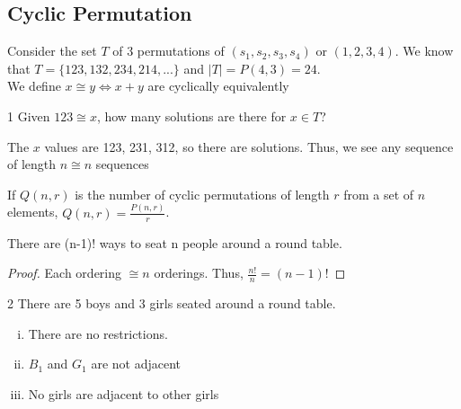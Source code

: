 \subsection{Cyclic Permutation}

Consider the set $T$ of 3 permutations of $(s_1, s_2, s_3, s_4)$ or $(1, 2, 3, 4)$. We know that $T = \{ 123, 132, 234, 214, ... \}$ and $|T| = P(4, 3) = 24$.\\

We define $x \cong y \iff x + y $ are cyclically equivalently 

\begin{problem}
    1 Given $123 \cong x$, how many solutions are there for $x \in T$?
\end{problem}

\begin{solution}
    The $x$ values are 123, 231, 312, so there are  solutions. Thus, we see any sequence of length $n \cong n$ sequences
\end{solution}

\begin{theorem}
    If $Q(n, r)$ is the number of cyclic permutations of length $r$ from a set of $n$ elements, $Q(n, r) = \frac{P(n, r)}{r}$.
\end{theorem}

\begin{theorem}
    There are (n-1)! ways to seat n people around a round table.
\end{theorem}

\begin{proof}
    Each ordering $\cong n$ orderings. Thus, $\frac{n!}{n} = (n-1)!$
\end{proof}

\begin{problem}
    2 There are 5 boys and 3 girls seated around a round table.
    \begin{enumerate}[(i)]
        \item There are no restrictions.
        \item $B_1$ and $G_1$ are not adjacent
        \item No girls are adjacent to other girls
    \end{enumerate}
\end{problem}

